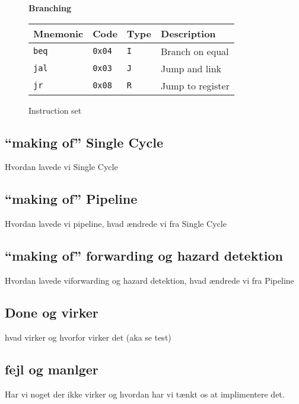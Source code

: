 \documentclass[11pt,twoside,a4paper]{article}
\begin{document}
\begin{figure}[H]
\begin{multicols}{2}
        \vspace{0.26in} %
        \textbf{Branching} \\
        \vspace{0.15in}
        \begin{tabular}{|l|l|l|l|}
                \hline
                \scriptsize {\bf Mnemonic} &
                \scriptsize {\bf Code} &
                \scriptsize {\bf Type} &
                \scriptsize {\bf Description} \\
                \hline {\tt beq} & {\tt 0x04} & {\tt I} & \scriptsize Branch on equal \\
                \hline {\tt jal} & {\tt 0x03} & {\tt J} & \scriptsize Jump and link \\
                \hline {\tt jr} & {\tt 0x08} & {\tt R} & \scriptsize Jump to register \\
                \hline
        \end{tabular}

        \end{multicols}
        \caption{Instruction set}
        \label{fig:instruction-set}
\end{figure}

\subsection{``making of'' Single Cycle}
Hvordan lavede vi Single Cycle

\subsection{``making of'' Pipeline}
Hvordan lavede vi pipeline, hvad ændrede vi fra Single Cycle

\subsection{``making of'' forwarding og hazard detektion}
Hvordan lavede viforwarding og hazard detektion, hvad ændrede vi fra Pipeline

\subsection{Done og virker}
hvad virker og hvorfor virker det (aka se test)

\subsection{fejl og manlger}
Har vi noget der ikke virker og hvordan har vi tænkt os at implimentere det.
\end{document}
